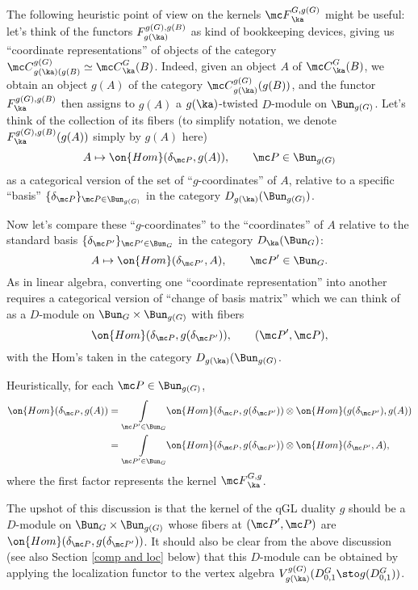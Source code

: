 \documentclass[11pt,reqno]{amsart}
\theoremstyle{plain}
\numberwithin{equation}{section}
\theoremstyle{definition}
\begin{document}
\medskip

The following heuristic point of view on the kernels ${\mc
  F}^{G,g(G)}_\ka$ might be useful: let's think of the functors
$F^{g(G),g(B)}_{g(\ka)}$ as kind of bookkeeping devices, giving us
``coordinate representations'' of objects of the category ${\mc
  C}^{g(G)}_{g(\ka)(g(B)} \simeq {\mc C}^G_\ka(B)$. Indeed, given an
object $A$ of ${\mc C}^G_\ka(B)$, we obtain an object $g(A)$ of the
category ${\mc C}^{g(G)}_{g(\ka)}(g(B))$, and the functor
$F^{g(G),g(B)}_\ka$ then assigns to $g(A)$ a $g(\ka)$-twisted
$D$-module on $\Bun_{g(G)}$. Let's think of the collection of its
fibers (to simplify notation, we denote $F^{g(G),g(B)}_\ka(g(A))$
simply by $g(A)$ here)
$$
A \mapsto \on{Hom}(\delta_{\mc P},g(A)), \qquad {\mc P} \in
\Bun_{g(G)}
$$
as a categorical version of the set of ``$g$-coordinates'' of $A$,
relative to a specific ``basis'' $\{ \delta_{\mc P} \}_{{\mc P} \in
  \Bun_{g(G)}}$ in the category $D_{g(\ka)}(\Bun_{g(G)})$.

Now let's compare these ``$g$-coordinates'' to the ``coordinates'' of
$A$ relative to the standard basis $\{ \delta_{{\mc P}'} \}_{{\mc P}'
  \in \Bun_G}$ in the category $D_\ka(\Bun_G)$:
$$
A \mapsto \on{Hom}(\delta_{{\mc P}'},A), \qquad {\mc P}' \in \Bun_{G}.
$$
As in linear algebra, converting one ``coordinate
representation'' into another requires a categorical version of
``change of basis matrix'' which we can think of as a $D$-module on
$\Bun_G \times \Bun_{g(G)}$ with fibers
$$
\on{Hom}(\delta_{\mc P},g(\delta_{{\mc P}'})), \qquad
({\mc P}',{\mc P}),
$$
with the Hom's taken in the category $D_{g(\ka)}(\Bun_{g(G)}$.

Heuristically, for each ${\mc P} \in \Bun_{g(G)}$,
\begin{align*}
\on{Hom}(\delta_{\mc P},g(A)) &= \underset{{\mc P}' \in \Bun_G}\int
\on{Hom}(\delta_{\mc P},g(\delta_{{\mc P}'})) \otimes
\on{Hom}(g(\delta_{{\mc P}'}),g(A)) \\ & = \underset{{\mc P}' \in
  \Bun_G}\int
\on{Hom}(\delta_{\mc P},g(\delta_{{\mc P}'})) \otimes
\on{Hom}(\delta_{{\mc P}'},A),
\end{align*}
where the first factor represents the kernel ${\mc F}^{G,g}_\ka$.

The upshot of this discussion is that the kernel of the qGL duality
$g$ should be a $D$-module on $\Bun_G \times \Bun_{g(G)}$ whose fibers
at $({\mc P}',{\mc P})$ are $\on{Hom}(\delta_{\mc P},g(\delta_{{\mc
    P}'}))$. It should also be clear from the above discussion (see
also Section \ref{comp and loc} below) that this $D$-module can be
obtained by applying the localization functor to the vertex algebra
$V^{g(G)}_{g(\ka)}(D^G_{0,1}\sto g(D^G_{0,1}))$.
\end{document}
